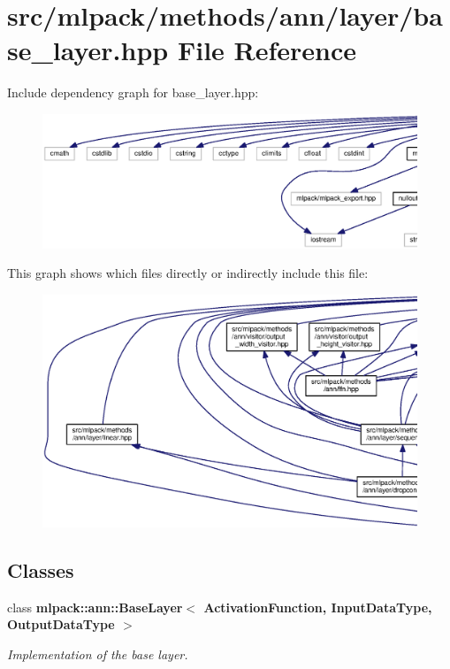 \section{src/mlpack/methods/ann/layer/base\+\_\+layer.hpp File Reference}
\label{base__layer_8hpp}
Include dependency graph for base\+\_\+layer.\+hpp\+:
\nopagebreak
\begin{figure}[H]
\begin{center}
\leavevmode
\includegraphics[width=350pt]{base__layer_8hpp__incl}
\end{center}
\end{figure}
This graph shows which files directly or indirectly include this file\+:
\nopagebreak
\begin{figure}[H]
\begin{center}
\leavevmode
\includegraphics[width=350pt]{base__layer_8hpp__dep__incl}
\end{center}
\end{figure}
\subsection*{Classes}
\begin{DoxyCompactItemize}
\item 
class {\bf mlpack\+::ann\+::\+Base\+Layer$<$ Activation\+Function, Input\+Data\+Type, Output\+Data\+Type $>$}
\begin{DoxyCompactList}\small\item\em Implementation of the base layer. \end{DoxyCompactList}\end{DoxyCompactItemize}

